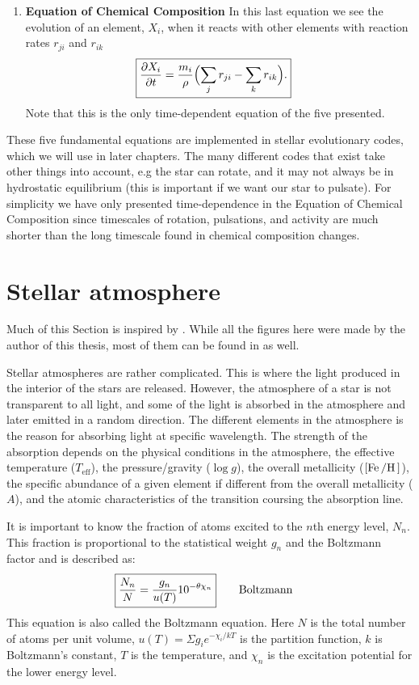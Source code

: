 \begin{enumerate}
    \item \textbf{Equation of Chemical Composition}
        \nicebreak
        In this last equation we see the evolution of an element, $X_i$, when it reacts with other
        elements with reaction rates $r_{ji}$ and $r_{ik}$
        \begin{align}
            \Aboxed{\pd{X_i}{t} &= \frac{m_i}{\rho} \Bigl( \sum_j r_{ji} - \sum_k r_{ik}\Bigr).}
        \end{align}
        Note that this is the only time-dependent equation of the five presented.
\end{enumerate}

These five fundamental equations are implemented in stellar evolutionary codes, which we will use in
later chapters. The many different codes that exist take other things into account, e.g the star can
rotate, and it may not always be in hydrostatic equilibrium (this is important if we want our star
to pulsate). For simplicity we have only presented time-dependence in the Equation of Chemical
Composition since timescales of rotation, pulsations, and activity are much shorter than the long
timescale found in chemical composition changes.


\section{Stellar atmosphere}

Much of this Section is inspired by \citet{Gray2006}. While all the figures here were made by the
author of this thesis, most of them can be found in \citet{Gray2006} as well.

Stellar atmospheres are rather complicated. This is where the light produced in the interior of the
stars are released. However, the atmosphere of a star is not transparent to all light, and some of
the light is absorbed in the atmosphere and later emitted in a random direction. The different
elements in the atmosphere is the reason for absorbing light at specific wavelength. The strength of
the absorption depends on the physical conditions in the atmosphere, the effective temperature
($T_\mathrm{eff}$), the pressure/gravity ($\log g$), the overall metallicity ($[\ion{Fe}/\ion{H}]$),
the specific abundance of a given element if different from the overall metallicity ($A$), and the
atomic characteristics of the transition coursing the absorption line.

It is important to know the fraction of atoms excited to the $n$th energy level, $N_n$. This
fraction is proportional to the statistical weight $g_n$ and the Boltzmann factor and is described
as:
\begin{align}
    \Aboxed{ \frac{N_n}{N} = \frac{g_n}{u(T)} 10^{-\theta\chi_n}} \tag*{Boltzmann}
\end{align}
This equation is also called the Boltzmann equation. Here $N$ is the total number of atoms per unit
volume, $u(T)=\Sigma g_i e^{-\chi_i/kT}$ is the partition function, $k$ is Boltzmann's constant, $T$
is the temperature, and $\chi_n$ is the excitation potential for the lower energy level.

